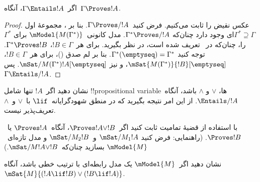 \documentclass[../../../include/open-logic-section]{subfiles}
\begin{document}


\begin{thm}
  اگر~$\Gamma \Entails !A$، آنگاه~$\Gamma \Proves !A$.
\end{thm}

\begin{proof}
  عکس نقیض را ثابت می‌کنیم. فرض کنید~$\Gamma \Proves/ !A$. بنا بر
  ، مجموعهٔ اول
  $\Gamma^* \supseteq \Gamma$ای وجود دارد چنان‌که
  $\Gamma^* \Proves/ !A$. مدل کانونی~$\mModel{M(\Gamma^*)}$ برای
  $\Gamma^*$ را، چنان‌که در~ تعریف
  شده است، در نظر بگیرید. برای هر~$!B \in \Gamma$،
  $\Gamma^* \Proves !B$. توجه کنید
  $\Gamma^*(\emptyseq) = \Gamma^*$. بنا بر لم صدق
  ()، برای هر~$!B \in \Gamma$،
  $\mSat{M(\Gamma^*)}{!B}[\emptyseq]$، و نیز
  $\mSat/{M(\Gamma^*)}{!A}[\emptyseq]$. پس~$\Gamma \Entails/ !A$.
\end{proof}

\begin{prob}
  نشان دهید اگر~$!A$ تنها شامل !!{propositional variable}ها، $\lor$ و
  $\land$ باشد، آنگاه~$\Entails/ !A$. از این امر نتیجه بگیرید که در
  منطق شهودگرایانه~$\lif$ با~$\lor$ و~$\land$ تعریف‌پذیر نیست.
\end{prob}
  
\begin{prob}
  با استفاده از قضیهٔ تمامیت ثابت کنید اگر~$\Proves !A \lor !B$،
  آنگاه~$\Proves !A$ یا~$\Proves !B$. (راهنمایی: فرض کنید
  $\mSat/{M_1}{!A}$ و~$\mSat/{M_2}{!B}$ و مدل تازه‌ای~$\mModel{M}$
  بسازید چنان‌که~$\mSat/{M}{!A \lor !B}$.)
\end{prob}
  
\begin{prob}
  نشان دهید اگر~$\mModel{M}$ یک مدل رابطه‌ای با ترتیب خطی باشد، آنگاه
  $\mSat{M}{(!A \lif !B)\lor(!B \lif !A)}$.
\end{prob}
\end{document}
